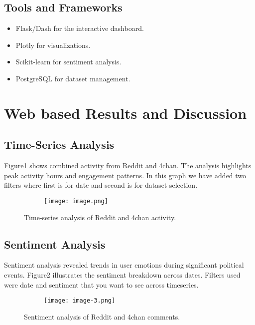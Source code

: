 \documentclass[sigconf]{acmart}
\begin{document}
\subsection{Tools and Frameworks}
\begin{itemize}
    \item Flask/Dash for the interactive dashboard.
    \item Plotly for visualizations.
    \item Scikit-learn for sentiment analysis.
    \item PostgreSQL for dataset management.
\end{itemize}

\section{Web based Results and Discussion}

\subsection{Time-Series Analysis}
Figure1 shows combined activity from Reddit and 4chan. The analysis highlights peak activity hours and engagement patterns. In this graph we have added two filters where first is for date and second is for dataset selection.

\begin{figure}[H]
    \centering
    \begin{figure}
        \centering
        \texttt{[image: image.png]}
        \label{fig:enter-label}
    \end{figure}
    \caption{Time-series analysis of Reddit and 4chan activity.}
    \label{fig:time_series}
\end{figure}

\subsection{Sentiment Analysis}
Sentiment analysis revealed trends in user emotions during significant political events. Figure2 illustrates the sentiment breakdown across dates. Filters used were date and sentiment that you want to see across timeseries.

\begin{figure}[H]
    \centering
    \begin{figure}
        \centering
        \texttt{[image: image-3.png]}
        \label{fig:enter-label}
    \end{figure}
    \caption{Sentiment analysis of Reddit and 4chan comments.}
    \label{fig:sentiment}
\end{figure}
\end{document}
